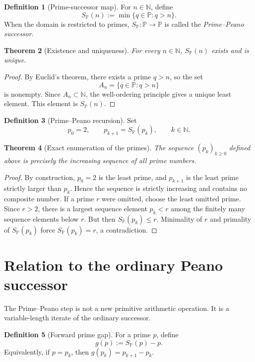 \documentclass[11pt]{article}
\newtheorem{theorem}{Theorem}[section]
\theoremstyle{definition}
\newtheorem{definition}[theorem]{Definition}
\newcommand{\N}{\mathbb{N}}
\newcommand{\Pp}{\mathbb{P}}
\newcommand{\SP}{S_{\!\Pp}}
\newcommand{\gap}{g}
\begin{document}
\begin{definition}[Prime-successor map]
For $n\in\N$, define
\[
\boxed{\SP(n):=\min\{q\in\Pp:q>n\}.}
\]
When the domain is restricted to primes, $\SP:\Pp\to\Pp$ is called the \emph{Prime--Peano successor}.
\end{definition}

\begin{theorem}[Existence and uniqueness]
For every $n\in\N$, $\SP(n)$ exists and is unique.
\end{theorem}

\begin{proof}
By Euclid's theorem, there exists a prime $q>n$, so the set
\[
A_n=\{q\in\Pp:q>n\}
\]
is nonempty. Since $A_n\subset\N$, the well-ordering principle gives a unique least element. This element is $\SP(n)$.
\end{proof}

\begin{definition}[Prime--Peano recursion]
Set
\[
p_0=2,
\qquad
p_{k+1}=\SP(p_k),\qquad k\in\N.
\]
\end{definition}

\begin{theorem}[Exact enumeration of the primes]
The sequence $(p_k)_{k\ge0}$ defined above is precisely the increasing sequence of all prime numbers.
\end{theorem}

\begin{proof}
By construction, $p_0=2$ is the least prime, and $p_{k+1}$ is the least prime strictly larger than $p_k$. Hence the sequence is strictly increasing and contains no composite number. If a prime $r$ were omitted, choose the least omitted prime. Since $r>2$, there is a largest sequence element $p_k<r$ among the finitely many sequence elements below $r$. But then $\SP(p_k)\le r$. Minimality of $r$ and primality of $\SP(p_k)$ force $\SP(p_k)=r$, a contradiction.
\end{proof}

\section{Relation to the ordinary Peano successor}

The Prime--Peano step is not a new primitive arithmetic operation. It is a variable-length iterate of the ordinary successor.

\begin{definition}[Forward prime gap]
For a prime $p$, define
\[
\gap(p):=\SP(p)-p.
\]
Equivalently, if $p=p_k$, then $\gap(p_k)=p_{k+1}-p_k$.
\end{definition}
\end{document}
